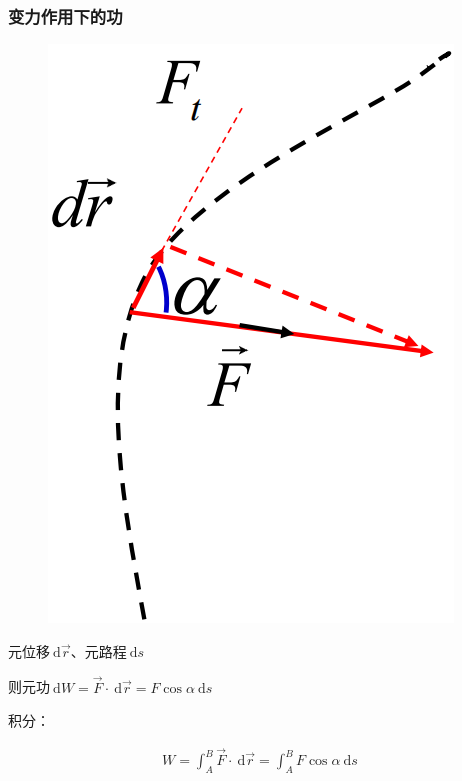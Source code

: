 \documentclass[12pt, a4paper]{article}
\numberwithin{equation}{section}
\newcommand{\rmd}{\mathrm{~d}}
\begin{document}
\subsubsection{变力作用下的功}

    \begin{figure}
        \centering
        \includegraphics[scale=0.2]{"Chapter 03 images/pic1.png"}
        \label{pic1}
    \end{figure}

    元位移\(\rmd \overrightarrow{r}\)、元路程\(\rmd s\)

    则元功\(\rmd W = \overrightarrow{F} \cdot \rmd \overrightarrow{r} =
    F \cos \alpha \rmd s\)

    积分：

    \begin{align}
        W=\int_A^B \overrightarrow{F} \cdot \rmd \overrightarrow{r}=\int_A^B F \cos \alpha \mathrm{~d} s
    \end{align}
\end{document}
